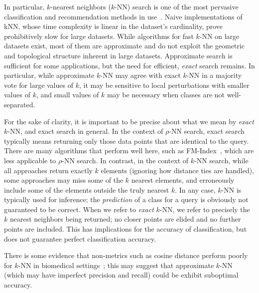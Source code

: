 In particular, $k$-nearest neighbors ($k$-NN) search is one of the most pervasive classification and recommendation methods in use~\cite{fix1952discriminatory, cover1967nearest}. 
Naive implementations of kNN, whose time complexity is linear in the dataset's cardinality, 
prove prohibitively slow for large datasets. While algorithms for fast $k$-NN on large datasets exist, most of them are approximate and do not 
exploit the geometric and topological structure inherent in large datasets. Approximate search is sufficient for some applications, but the 
need for efficient, \emph{exact} search remains.
In particular, while approximate $k$-NN may agree with exact $k$-NN in a majority vote for large values of $k$, it may be sensitive to local perturbations with smaller values of $k$, and small values of $k$ may be necessary when classes are not well-separated.

For the sake of clarity, it is important to be precise about what we mean by \emph{exact} $k$-NN, and exact search in general.
In the context of $\rho$-NN search, exact search typically means returning only those data points that are identical to the query.
There are many algorithms that perform well here, such as FM-Index~\cite{ferragina2000opportunistic}, which are less applicable to $\rho$-NN search.
In contrast, in the context of $k$-NN search, while all approaches return exactly $k$ elements (ignoring how distance ties are handled), some approaches may miss some of the $k$ nearest elements, and erroneously include some of the elements outside the truly nearest $k$.
In any case, $k$-NN is typically used for inference; the \emph{prediction} of a class for a query is obviously not guaranteed to be correct.
When we refer to \emph{exact} $k$-NN, we refer to precisely the $k$ nearest neighbors being returned; no closer points are elided and no further points are included.
This has implications for the accuracy of classification, but does not guarantee perfect classification accuracy.
 
There is some evidence that non-metrics such as cosine distance perform poorly for $k$-NN in biomedical settings~\cite{hu2016distance}; this may suggest that approximate $k$-NN (which may have imperfect precision and recall) could be exhibit suboptimal accuracy.

